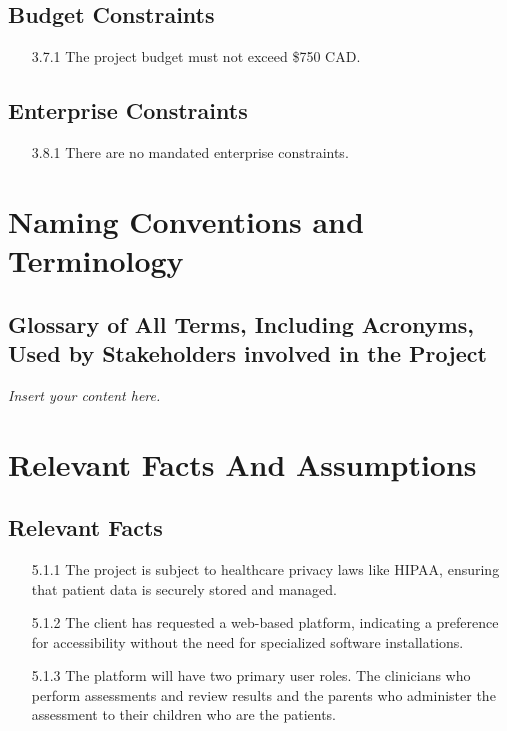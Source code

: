 \documentclass[12pt]{article}
\newcommand{\lips}{\textit{Insert your content here.}}
\begin{document}
\subsection{Budget Constraints}
\begin{itemize}
  \item[3.7.1] The project budget must not exceed \$750 CAD. 
\end{itemize}
\subsection{Enterprise Constraints}
\begin{itemize}
  \item[3.8.1] \color{red} There are no mandated enterprise constraints. \color{black}
\end{itemize}

\section{Naming Conventions and Terminology}
\subsection{Glossary of All Terms, Including Acronyms, Used by Stakeholders
involved in the Project}
\lips

\section{Relevant Facts And Assumptions}
\subsection{Relevant Facts}
\begin{itemize}
  \item[5.1.1] The project is subject to healthcare privacy laws like HIPAA, ensuring that patient data is securely stored and managed.
  \item[5.1.2] The client has requested a web-based platform, indicating a preference for accessibility without the need for specialized 
  software installations.
  \item[5.1.3] The platform will have two primary user roles. The clinicians who perform assessments and review results and the parents who 
  administer the assessment to their children who are the patients.
\end{itemize}
\end{document}
